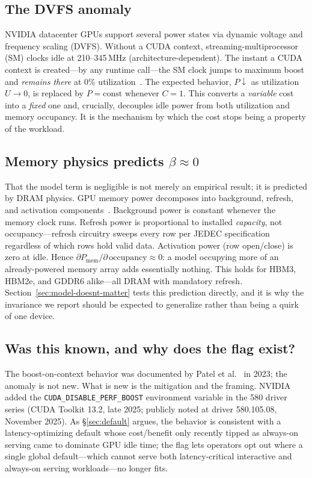 \documentclass[conference]{IEEEtran}
\newcommand{\perfboost}{\texttt{\mbox{CUDA}\_\hspace{0pt}\mbox{DISABLE}\_\hspace{0pt}\mbox{PERF}\_\hspace{0pt}\mbox{BOOST}}\xspace}
\begin{document}
\subsection{The DVFS anomaly}
NVIDIA datacenter GPUs support several power states via dynamic voltage and frequency scaling (DVFS). Without a CUDA context, streaming-multiprocessor (SM) clocks idle at 210--345\,MHz (architecture-dependent). The instant a CUDA context is created---by any runtime call---the SM clock jumps to maximum boost and \emph{remains there} at 0\% utilization~\cite{patel-cal23}. The expected behavior, $P \downarrow$ as utilization $U \to 0$, is replaced by $P = \text{const}$ whenever $C=1$. This converts a \emph{variable} cost into a \emph{fixed} one and, crucially, decouples idle power from both utilization and memory occupancy. It is the mechanism by which the cost stops being a property of the workload.

\subsection{Memory physics predicts $\beta \approx 0$}
That the model term is negligible is not merely an empirical result; it is predicted by DRAM physics. GPU memory power decomposes into background, refresh, and activation components~\cite{hbm-spec,micron-ddr}. Background power is constant whenever the memory clock runs. Refresh power is proportional to installed \emph{capacity}, not occupancy---refresh circuitry sweeps every row per JEDEC specification regardless of which rows hold valid data. Activation power (row open/close) is zero at idle. Hence $\partial P_{\text{mem}}/\partial\,\text{occupancy} \approx 0$: a model occupying more of an already-powered memory array adds essentially nothing. This holds for HBM3, HBM2e, and GDDR6 alike---all DRAM with mandatory refresh. Section~\ref{sec:model-doesnt-matter} tests this prediction directly, and it is why the invariance we report should be expected to generalize rather than being a quirk of one device.

\subsection{Was this known, and why does the flag exist?}
The boost-on-context behavior was documented by Patel et al.~\cite{patel-cal23} in 2023; the anomaly is not new. What is new is the mitigation and the framing. NVIDIA added the \perfboost environment variable in the 580 driver series (CUDA Toolkit 13.2, late 2025; publicly noted at driver 580.105.08, November 2025). As \S\ref{sec:default} argues, the behavior is consistent with a latency-optimizing default whose cost/benefit only recently tipped as always-on serving came to dominate GPU idle time; the flag lets operators opt out where a single global default---which cannot serve both latency-critical interactive and always-on serving workloads---no longer fits.
\end{document}
